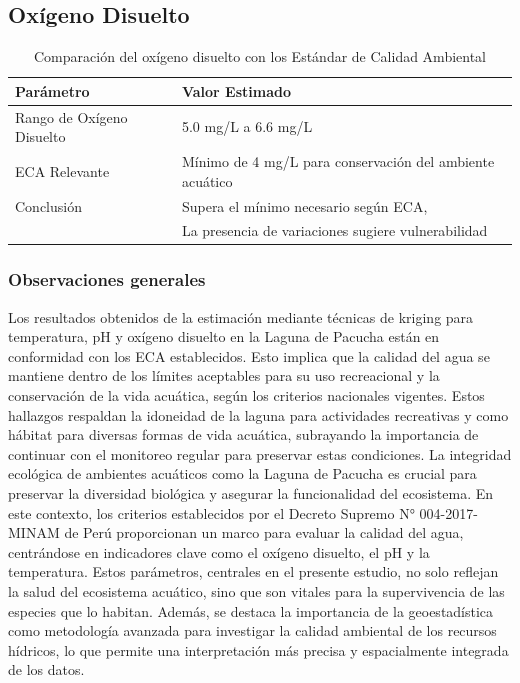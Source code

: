 \subsection*{Oxígeno Disuelto}


\begin{table}[H]
\centering
\caption{Comparación del oxígeno disuelto  con los Estándar de Calidad Ambiental }
\begin{tabular}{ll}
\toprule
Parámetro & Valor Estimado \\
\midrule
Rango de Oxígeno Disuelto & 5.0 mg/L a 6.6 mg/L \\
ECA Relevante & Mínimo de 4 mg/L para conservación del ambiente acuático \\
Conclusión & Supera el mínimo necesario según ECA,  \\
& La presencia de variaciones sugiere vulnerabilidad  \\

\bottomrule
\end{tabular}
\end{table}

\subsubsection{Observaciones generales}
Los resultados obtenidos de la estimación mediante técnicas de kriging para temperatura,
pH y oxígeno disuelto en la Laguna de Pacucha están en conformidad con los
ECA establecidos. Esto implica que la calidad del agua se mantiene dentro de los límites
aceptables para su uso recreacional y la conservación de la vida acuática, según los
criterios nacionales vigentes. Estos hallazgos respaldan la idoneidad de la laguna para
actividades recreativas y como hábitat para diversas formas de vida acuática, subrayando
la importancia de continuar con el monitoreo regular para preservar estas condiciones.
La integridad ecológica de ambientes acuáticos como la Laguna de Pacucha es crucial
para preservar la diversidad biológica y asegurar la funcionalidad del ecosistema. En este
contexto, los criterios establecidos por el Decreto Supremo N° 004-2017-MINAM de
Perú proporcionan un marco para evaluar la calidad del agua, centrándose en indicadores
clave como el oxígeno disuelto, el pH y la temperatura. Estos parámetros, centrales en el
presente estudio, no solo reflejan la salud del ecosistema acuático, sino que son vitales
para la supervivencia de las especies que lo habitan. Además, se destaca la importancia
de la geoestadística como metodología avanzada para investigar la calidad ambiental
de los recursos hídricos, lo que permite una interpretación más precisa y espacialmente
integrada de los datos.

